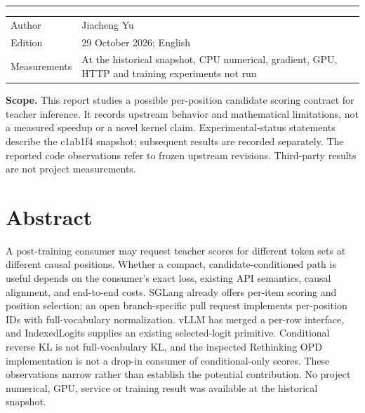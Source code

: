 \documentclass[11pt,a4paper]{article}
\begin{document}
\hypersetup{pageanchor=false}
\begin{titlepage}
\vspace*{11mm}{\small\sffamily\bfseries AI INFRASTRUCTURE / TECHNICAL REPORT}\par
\vspace{14mm}{\LARGE\bfseries Candidate-Conditioned\\[2mm]Teacher Scoring\par}
\vspace{6mm}{\large Systems context, probability contract, prior art and evaluation design\par}
\vspace{9mm}\hrule\vspace{7mm}
\begin{tabularx}{\linewidth}{@{}p{40mm}Y@{}}
Author & Jiacheng Yu\\
Edition & 29 October 2026; English\\
Measurements & At the historical snapshot, CPU numerical, gradient, GPU, HTTP and training experiments not run\\
\end{tabularx}
\par\vspace{10mm}\noindent\textbf{Scope.} This report studies a possible per-position candidate scoring contract for teacher inference. It records upstream behavior and mathematical limitations, not a measured speedup or a novel kernel claim. Experimental-status statements describe the c1ab1f4 snapshot; subsequent results are recorded separately.
\vfill{\small The reported code observations refer to frozen upstream revisions. Third-party results are not project measurements.}
\end{titlepage}
\hypersetup{pageanchor=true}
\section*{Abstract}
A post-training consumer may request teacher scores for different token sets at different causal positions. Whether a compact, candidate-conditioned path is useful depends on the consumer's exact loss, existing API semantics, causal alignment, and end-to-end costs. SGLang already offers per-item scoring and position selection; an open branch-specific pull request implements per-position IDs with full-vocabulary normalization. vLLM has merged a per-row interface, and IndexedLogits supplies an existing selected-logit primitive. Conditional reverse KL is not full-vocabulary KL, and the inspected Rethinking OPD implementation is not a drop-in consumer of conditional-only scores. These observations narrow rather than establish the potential contribution. No project numerical, GPU, service or training result was available at the historical snapshot.
\tableofcontents\clearpage
\end{document}
